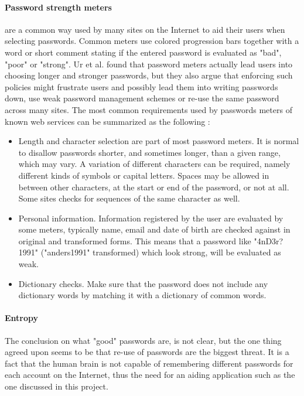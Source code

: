 \paragraph{Password strength meters} are a common way used by many sites on the Internet to aid their users when selecting passwords. Common meters use colored progression bars together with a word or short comment stating if the entered password is evaluated as "bad", "poor" or "strong". Ur et al. \cite{password-meters2} found that password meters actually lead users into choosing longer and stronger passwords, but they also argue that enforcing such policies might frustrate users and possibly lead them into writing passwords down, use weak password management schemes or re-use the same password across many sites. The most common requirements used by passwords meters of known web services can be summarized as the following \cite{password-meters}:
\begin{itemize}
    \item{Length and character selection} are part of most password meters. It is normal to disallow passwords shorter, and sometimes longer, than a given range, which may vary. A variation of different characters can be required, namely different kinds of symbols or capital letters. Spaces may be allowed in between other characters, at the start or end of the password, or not at all. Some sites checks for sequences of the same character as well.
    \item{Personal information.} Information registered by the user are evaluated by some meters, typically name, email and date of birth are checked against in original and transformed forms. This means that a password like "4nD3r?1991" ("anders1991" transformed) which look strong, will be evaluated as weak.
    \item{Dictionary checks.} Make sure that the password does not include any dictionary words by matching it with a dictionary of common words. 
\end{itemize}

\paragraph{Entropy}


\par The conclusion on what "good" passwords are, is not clear, but the one thing agreed upon seems to be that re-use of passwords are the biggest threat. It is a fact that the human brain is not capable of remembering different passwords for each account on the Internet, thus the need for an aiding application such as the one discussed in this project. 



